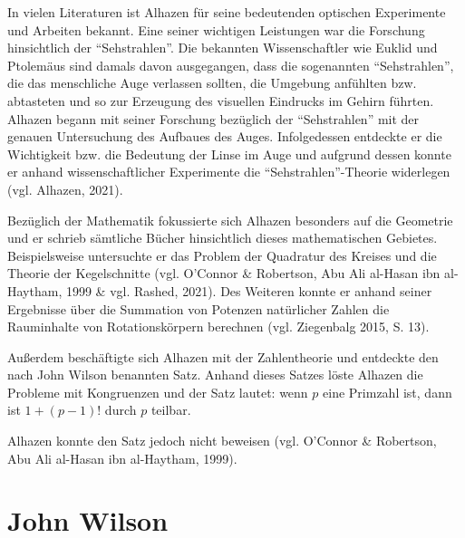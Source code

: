 In vielen Literaturen ist Alhazen für seine bedeutenden
optischen Experimente und Arbeiten bekannt. Eine seiner
wichtigen Leistungen war die Forschung hinsichtlich der
``Sehstrahlen''. Die bekannten Wissenschaftler wie Euklid
und Ptolemäus sind damals davon ausgegangen, dass die
sogenannten ``Sehstrahlen'', die das menschliche Auge
verlassen sollten, die Umgebung anfühlten bzw. abtasteten
und so zur Erzeugung des visuellen Eindrucks im Gehirn
führten. Alhazen begann mit seiner Forschung bezüglich
der ``Sehstrahlen'' mit der genauen Untersuchung des
Aufbaues des Auges. Infolgedessen entdeckte er die
Wichtigkeit bzw. die Bedeutung der Linse im Auge und
aufgrund dessen konnte er anhand wissenschaftlicher
Experimente die ``Sehstrahlen''-Theorie widerlegen
(vgl. Alhazen, 2021).

Bezüglich der Mathematik fokussierte sich Alhazen
besonders auf die Geometrie und er schrieb sämtliche
Bücher hinsichtlich dieses mathematischen Gebietes.
Beispielsweise untersuchte er das Problem der Quadratur
des Kreises und die Theorie der Kegelschnitte
(vgl. O'Connor \& Robertson, Abu Ali al-Hasan ibn 
al-Haytham, 1999 \& vgl. Rashed, 2021). Des Weiteren
konnte er anhand seiner Ergebnisse über die Summation
von Potenzen natürlicher Zahlen die Rauminhalte von
Rotationskörpern berechnen (vgl. Ziegenbalg 2015, S. 13).

Außerdem beschäftigte sich Alhazen mit der Zahlentheorie
und entdeckte den nach John Wilson benannten Satz.
Anhand dieses Satzes löste Alhazen die Probleme mit
Kongruenzen und der Satz lautet: wenn $p$ eine Primzahl
ist, dann ist $1+(p-1)!$ durch $p$ teilbar.

Alhazen konnte den Satz jedoch nicht beweisen
(vgl. O'Connor \& Robertson, Abu Ali al-Hasan
ibn al-Haytham, 1999).


\section{John Wilson}

